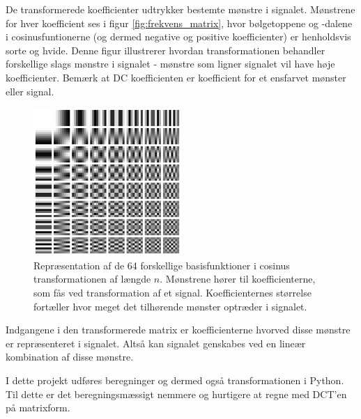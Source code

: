 De transformerede koefficienter udtrykker bestemte mønstre i signalet. Mønstrene for hver koefficient ses i figur \vref{fig:frekvens_matrix}, hvor bølgetoppene og -dalene i cosinusfuntionerne (og dermed negative og positive koefficienter) er henholdsvis sorte og hvide. Denne figur illustrerer hvordan transformationen behandler forskellige slags mønstre i signalet - mønstre som ligner signalet vil have høje koefficienter. Bemærk at DC koefficienten er koefficient for et ensfarvet mønster eller signal.
\begin{figure}[htbp]
\centering
\includegraphics[width=0.5\textwidth]{billeder/frekvensmatrix.png}
\caption{Repræsentation af de 64 forskellige basisfunktioner i cosinus transformationen af længde $n$. Mønstrene hører til koefficienterne, som fås ved transformation af et signal. Koefficienternes størrelse fortæller hvor meget det tilhørende mønster optræder i signalet.}
\label{fig:frekvens_matrix}
\end{figure}

Indgangene i den transformerede matrix er koefficienterne hvorved disse mønstre er repræsenteret i signalet. Altså kan signalet genskabes ved en lineær kombination af disse mønstre.

I dette projekt udføres beregninger og dermed også transformationen i Python. Til dette er det beregningsmæssigt nemmere og hurtigere at regne med DCT'en på matrixform.

